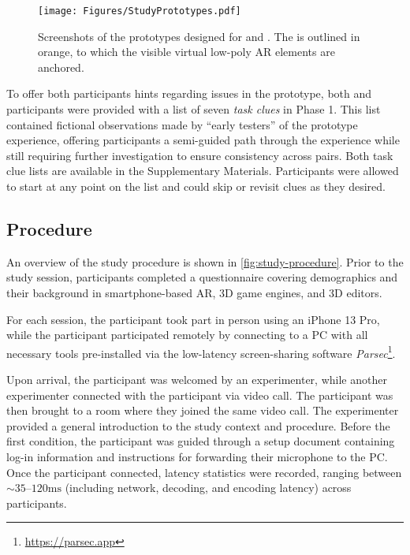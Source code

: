 \begin{figure*}
    \centering
    \texttt{[image: Figures/StudyPrototypes.pdf]}
    \caption{Screenshots of the prototypes designed for \locA and \locB. The \locMesh is outlined in orange, to which the visible virtual low-poly AR elements are anchored.}
    \label{fig:study-prototypes}
\end{figure*}

To offer both participants hints regarding issues in the prototype, both \insitu and \exsitu participants were provided with a list of seven \textit{task clues} in Phase 1. This list contained fictional observations made by ``early testers'' of the prototype experience, offering participants a semi-guided path through the experience while still requiring further investigation to ensure consistency across pairs. Both task clue lists are available in the Supplementary Materials. Participants were allowed to start at any point on the list and could skip or revisit clues as they desired.

\subsection{Procedure}\label{sec:procedure}
An overview of the study procedure is shown in \cref{fig:study-procedure}. Prior to the study session, participants completed a questionnaire covering demographics and their background in smartphone-based AR, 3D game engines, and 3D editors.

For each session, the \insitu participant took part in person using an iPhone 13 Pro, while the \exsitu participant participated remotely by connecting to a PC with all necessary tools pre-installed via the low-latency screen-sharing software \textit{Parsec}\footnote{\url{https://parsec.app}}.

Upon arrival, the \insitu participant was welcomed by an experimenter, while another experimenter connected with the \exsitu participant via video call. The \insitu participant was then brought to a room where they joined the same video call. The experimenter provided a general introduction to the study context and procedure. Before the first condition, the \exsitu participant was guided through a setup document containing log-in information and instructions for forwarding their microphone to the PC. Once the \exsitu participant connected, latency statistics were recorded, ranging between ${\sim}35$–$120\text{ms}$ (including network, decoding, and encoding latency) across participants.

